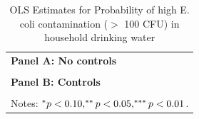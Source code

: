 \begin{table}[!ht]\centering
\caption{OLS Estimates for Probability of high E. coli contamination ($>$ 100 CFU) in household drinking water}\label{tab:Est_EColi_OLS_VeryHighRiskHome_full}
\begin{tabular}{l}
\hline \hline
\textbf{Panel A: No controls}\\[2pt]
\\[6pt]
\textbf{Panel B: Controls}\\[2pt]
\\[4pt]
\multicolumn{1}{p{0.95\linewidth}}{Notes: $\sym{*} p<0.10,\sym{**} p<0.05,\sym{***} p<0.01$.} \\
\hline
\end{tabular}
\end{table}
